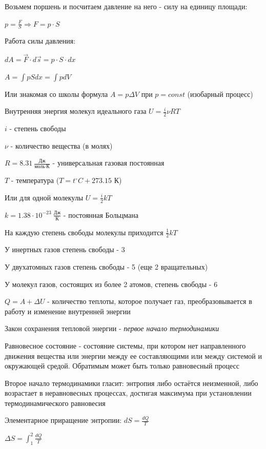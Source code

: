 \documentclass[12pt]{article}
\begin{document}
    Возьмем поршень и посчитаем давление на него - силу на единицу площади:

    $p = \frac{F}{S} \Longrightarrow F = p \cdot S$

    Работа силы давления:

    $dA = \vec{F} \cdot d\vec{s} = p \cdot S \cdot dx$

    $A = \int pS dx = \int p dV$

    Или знакомая со школы формула $A = p\Delta V$ при $p = const$ (изобарный процесс)

    Внутренняя энергия молекул идеального газа $U = \frac{i}{2} \nu R T$

    $i$ - степень свободы

    $\nu$ - количество вещества (в молях)

    $R = 8.31\ \frac{\text{Дж}}{\text{моль} \cdot \text{К}}$ - универсальная газовая постоянная

    $T$ - температура ($T = t^\circ C + 273.15$ К)

    Или для одной молекулы $U = \frac{i}{2} kT$

    $k = 1.38 \cdot 10^{-23}\ \frac{\text{Дж}}{\text{К}}$ - постоянная Больцмана

    На каждую степень свободы молекулы приходится $\frac{1}{2}kT$

    У инертных газов степень свободы - 3

    У двухатомных газов степень свободы - 5 (еще 2 вращательных)

    У молекул газов, состоящих из более 2 атомов, степень свободы - 6

    $Q = A + \Delta U$ - количество теплоты, которое получает газ, преобразовывается в работу и изменение внутренней энергии

    Закон сохранения тепловой энергии - \textit{первое начало термодинамики}

    Равновесное состояние - состояние системы, при котором нет направленного движения вещества или энергии 
    между ее составляющими или между системой и окружающей средой. 
    Обратимым может быть только равновесный процесс

    Второе начало термодинамики гласит: энтропия либо остаётся неизменной, либо возрастает в неравновесных процессах, 
    достигая максимума при установлении термодинамического равновесия

    Элементарное приращение энтропии: $dS = \frac{dQ}{T}$

    $\Delta S = \int_1^2 \frac{dQ}{T}$
\end{document}
